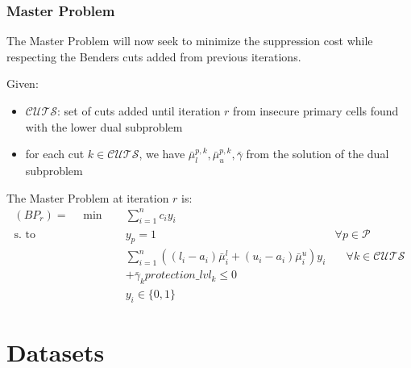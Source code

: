 \documentclass[11pt,a4paper]{article}
\begin{document}
\subsubsection{Master Problem}
The Master Problem will now seek to minimize the suppression cost while respecting the Benders cuts added from previous iterations.

Given:
\begin{itemize}
  \item $\mathcal{CUTS}$: set of cuts added until iteration $r$ from insecure primary cells found with the lower dual subproblem
  \item for each cut $k \in \mathcal{CUTS}$, we have $\bar{\mu}_{l}^{p, k}, \bar{\mu}_{u}^{p, k}, \bar{\gamma}$ from the solution of the dual subproblem
\end{itemize}
The Master Problem at iteration $r$ is:
\begin{align*}
(BP_r) = \quad \min \quad & \sum_{i=1}^{n}c_i y_i \\
\text{s. to} \quad & y_p = 1 & \forall p \in \mathcal{P}\\
& \sum_{i=1}^{n}((l_i - a_i)\bar{\mu}_{i}^{l} + (u_i-a_i) \bar{\mu}_{i}^{u})y_i & \quad \forall k \in \mathcal{CUTS} \\
&  + \bar{\gamma}_{k} protection\_lvl_{k} \leq 0 \\
& y_i \in \{0, 1\}  
\end{align*}



\section{Datasets}
\label{sec:datasets}
\end{document}
